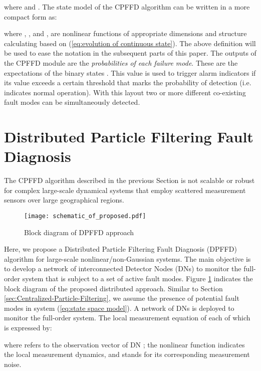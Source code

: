 \documentclass[10pt,twocolumn,twoside]{IEEEtran}
\begin{document}
\noindent where  and . The state model of the CPFFD algorithm can be written in a more
compact form as:

\noindent where ,
, and , 
are nonlinear functions of appropriate dimensions and structure calculating
based on (\ref{eq:evolution of continuous state}). The above definition
will be used to ease the notation in the subsequent parts of this
paper. The outputs of the CPFFD module are the \emph{probabilities
of each failure mode}. These are the expectations of the binary states
.
This value is used to trigger alarm indicators if its value exceeds
a certain threshold  that marks the probability
of detection (i.e.  indicates
normal operation). With this layout two or more different co-existing
fault modes can be simultaneously detected. 


\section{Distributed Particle Filtering Fault Diagnosis }\label{sec:Distributed-Particle-Filtering}

The CPFFD algorithm described in the previous Section is not scalable
or robust for complex large-scale dynamical systems that employ scattered
measurement sensors over large geographical regions. 





\begin{figure}
\centering{}\texttt{[image: schematic\_of\_proposed.pdf]}\caption{Block diagram of DPFFD approach \label{fig:Proposed-distributed-fault}}
\end{figure}

Here, we propose a Distributed Particle Filtering Fault Diagnosis
(DPFFD) algorithm for large-scale nonlinear/non-Gaussian systems.
The main objective is to develop a network of interconnected Detector
Nodes (DNs) to monitor the full-order system that is subject to a
set of active fault modes. Figure \ref{fig:Proposed-distributed-fault} indicates the block
diagram of the proposed distributed approach. Similar to Section \ref{sec:Centralized-Particle-Filtering}, we assume the presence of 
potential fault modes in system  (\ref{eq:state space model}).
A network of  DNs is deployed to monitor the full-order system.
The local measurement equation of each of which is expressed by:

where  refers to the observation
vector of DN ; the nonlinear function 
indicates the local measurement dynamics, and  stands
for its corresponding measurement noise.
\end{document}
